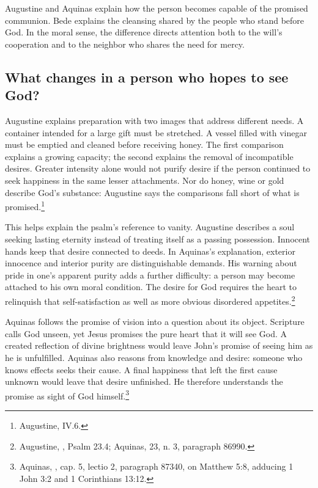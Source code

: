 Augustine and Aquinas explain how the person becomes capable of the promised communion. Bede explains the cleansing shared by the people who stand before God. In the moral sense, the difference directs attention both to the will's cooperation and to the neighbor who shares the need for mercy.

\subsection{What changes in a person who hopes to see God?}
Augustine explains preparation with two images that address different needs. A container intended for a large gift must be stretched. A vessel filled with vinegar must be emptied and cleaned before receiving honey. The first comparison explains a growing capacity; the second explains the removal of incompatible desires. Greater intensity alone would not purify desire if the person continued to seek happiness in the same lesser attachments. Nor do honey, wine or gold describe God's substance: Augustine says the comparisons fall short of what is promised.\footnote{Augustine,  IV.6.}

This helps explain the psalm's reference to vanity. Augustine describes a soul seeking lasting eternity instead of treating itself as a passing possession. Innocent hands keep that desire connected to deeds. In Aquinas's explanation, exterior innocence and interior purity are distinguishable demands. His warning about pride in one's apparent purity adds a further difficulty: a person may become attached to his own moral condition. The desire for God requires the heart to relinquish that self-satisfaction as well as more obvious disordered appetites.\footnote{Augustine, , Psalm 23.4; Aquinas,  23, n. 3, paragraph 86990.}

Aquinas follows the promise of vision into a question about its object. Scripture calls God unseen, yet Jesus promises the pure heart that it will see God. A created reflection of divine brightness would leave John's promise of seeing him as he is unfulfilled. Aquinas also reasons from knowledge and desire: someone who knows effects seeks their cause. A final happiness that left the first cause unknown would leave that desire unfinished. He therefore understands the promise as sight of God himself.\footnote{Aquinas, , cap. 5, lectio 2, paragraph 87340, on Matthew 5:8, adducing 1 John 3:2 and 1 Corinthians 13:12.}

